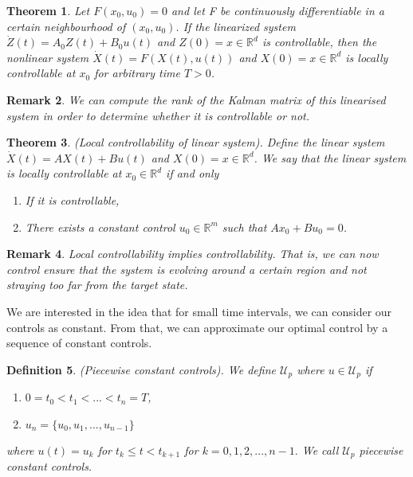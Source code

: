 \documentclass[twoside]{article}
\newcounter{lecnum}
\newtheorem{theorem}{Theorem}[lecnum]
\newtheorem{remark}[theorem]{Remark}
\newtheorem{definition}[theorem]{Definition}
\begin{document}
\begin{theorem}Let $F(x_0,u_0) = 0$ and let F be continuously differentiable in a certain neighbourhood of $(x_0,u_0)$. If the linearized system $\dot{Z}(t) = A_0Z(t) + B_0u(t)$ and $Z(0) = x \in \mathbb{R}^d$ is controllable, then the nonlinear system $\dot{X}(t) = F(X(t),u(t))$ and
$X(0) = x \in \mathbb{R}^d$ is locally controllable at $x_0$ for arbitrary time $T > 0$.
\end{theorem}

\begin{remark}We can compute the rank of the Kalman matrix of this linearised system in order to determine whether it is controllable or not.
\end{remark}


\begin{theorem}(Local controllability of linear system). Define the linear system $\dot{X}(t) = AX(t) + Bu(t)$ and $X(0) = x \in \mathbb{R}^d$. We say that the linear system is locally controllable at $x_0 \in \mathbb{R}^d$ if and only 
\begin{enumerate}
\item If it is controllable,
\item There exists a constant control $u_0 \in \mathbb{R}^m$ such that $Ax_0 + Bu_0 = 0$.
\end{enumerate}
\end{theorem}

\begin{remark}Local controllability implies controllability. That is, we can now control ensure that the system is evolving around a certain region and not straying too far from the target state.
\end{remark}

We are interested in the idea that for small time intervals, we can consider our controls as constant. From that, we can approximate our optimal control by a sequence of constant controls.

\begin{definition}(Piecewise constant controls). We define $\mathcal{U}_p$ where $u \in \mathcal{U}_p$ if 
\begin{enumerate}
\item $0 = t_0 < t_1 < ... < t_n = T$,
\item $u_n = \{u_0, u_1, ..., u_{n-1}\}$
\end{enumerate}
where $u(t) = u_k$ for $t_k \leq t < t_{k+1}$ for $k = 0,1,2,...,n-1.$ We call $\mathcal{U}_p$ piecewise constant controls.
\end{definition}
\end{document}
